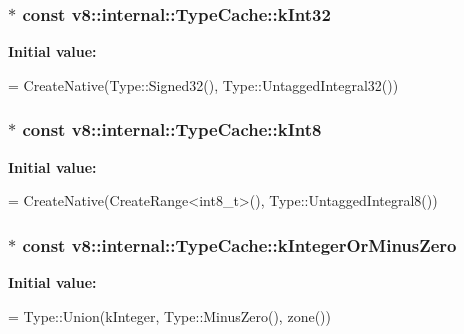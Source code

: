 \subsubsection[{\texorpdfstring{k\+Int32}{kInt32}}]{$\ast$ const v8\+::internal\+::\+Type\+Cache\+::k\+Int32}\hypertarget{classv8_1_1internal_1_1_type_cache_a53cb7ee36acc1b23abb5746ac0056f8b}{}\label{classv8_1_1internal_1_1_type_cache_a53cb7ee36acc1b23abb5746ac0056f8b}
{\bfseries Initial value\+:}
\begin{DoxyCode}
=
      CreateNative(Type::Signed32(), Type::UntaggedIntegral32())
\end{DoxyCode}
\subsubsection[{\texorpdfstring{k\+Int8}{kInt8}}]{$\ast$ const v8\+::internal\+::\+Type\+Cache\+::k\+Int8}\hypertarget{classv8_1_1internal_1_1_type_cache_a56adccfba0e8f5c6a140957fff88f25c}{}\label{classv8_1_1internal_1_1_type_cache_a56adccfba0e8f5c6a140957fff88f25c}
{\bfseries Initial value\+:}
\begin{DoxyCode}
=
      CreateNative(CreateRange<int8\_t>(), Type::UntaggedIntegral8())
\end{DoxyCode}
\subsubsection[{\texorpdfstring{k\+Integer\+Or\+Minus\+Zero}{kIntegerOrMinusZero}}]{$\ast$ const v8\+::internal\+::\+Type\+Cache\+::k\+Integer\+Or\+Minus\+Zero}\hypertarget{classv8_1_1internal_1_1_type_cache_a84a54bd2109b8c54e483fe720e0253bb}{}\label{classv8_1_1internal_1_1_type_cache_a84a54bd2109b8c54e483fe720e0253bb}
{\bfseries Initial value\+:}
\begin{DoxyCode}
=
      Type::Union(kInteger, Type::MinusZero(), zone())
\end{DoxyCode}
